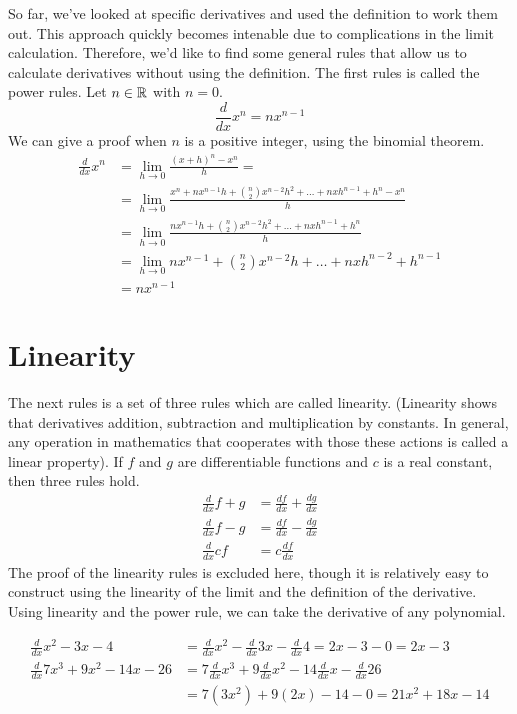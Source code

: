 \documentclass[fleqn]{report}
\begin{document}
So far, we've looked at specific derivatives and used the
definition to work them out. This approach quickly becomes
intenable due to complications in the limit calculation.
Therefore, we'd like to find some general rules that allow us
to calculate derivatives without using the definition. The
first rules is called the power rules. Let $n \in \mathbb{R}$ with $n=0$.
\begin{equation*}
\frac{d}{dx} x^n = nx^{n-1} 
\end{equation*}
We can give a proof when $n$ is a positive integer, using the
binomial theorem.
\begin{align*}
\frac{d}{dx} x^n & = \lim_{h \rightarrow 0} \frac{(x+h)^n -
x^n}{h} = \\
& = \lim_{h \rightarrow 0} \frac{x^n + nx^{n-1}h + \binom{n}{2}
x^{n-2}h^2 + \ldots + nxh^{n-1} + h^n - x^n}{h} \\
& = \lim_{h \rightarrow 0} \frac{nx^{n-1}h + \binom{n}{2}
x^{n-2}h^2 + \ldots + nxh^{n-1} + h^n}{h} \\
& = \lim_{h \rightarrow 0} nx^{n-1} + \binom{n}{2} x^{n-2}h + 
\ldots + nxh^{n-2} + h^{n-1} \\
& = nx^{n-1}
\end{align*}

\section*{Linearity}

The next rules is a set of three rules which are called
linearity. (Linearity shows that derivatives addition,
subtraction and multiplication by constants. In general, any
operation in mathematics that cooperates with those these
actions is called a linear property). If $f$ and $g$ are
differentiable functions and $c$ is a real constant, then
three rules hold.
\begin{align*}
\frac{d}{dx} f + g & = \frac{df}{dx} + \frac{dg}{dx} \\
\frac{d}{dx} f - g & = \frac{df}{dx} - \frac{dg}{dx} \\
\frac{d}{dx} cf & = c \frac{df}{dx}
\end{align*}
The proof of the linearity rules is excluded here, though it
is relatively easy to construct using the linearity of the
limit and the definition of the derivative. Using linearity
and the power rule, we can take the derivative of any
polynomial. 

\begin{example}
\begin{align*}
\frac{d}{dx} x^2 -3x -4 & = \frac{d}{dx} x^2 - \frac{d}{dx} 3x
- \frac{d}{dx} 4 = 2x - 3 - 0 = 2x -3 \\
\frac{d}{dx} 7x^3 + 9x^2 - 14x - 26 & = 7 \frac{d}{dx} x^3 + 9
\frac{d}{dx} x^2 - 14 \frac{d}{dx} x - \frac{d}{dx} 26 \\
& = 7 (3x^2) + 9(2x) - 14 - 0 = 21 x^2 + 18 x - 14 
\end{align*}
\end{example}
\end{document}
